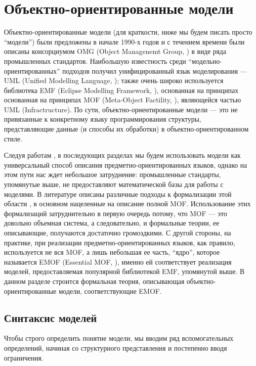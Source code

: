 \chapter{Объектно-ориентированные модели}

Объектно-ориентированные модели (для краткости, ниже мы будем писать просто ``модели'') были предложены в начале 1990-х годов \cite{Booch, Rumbaugh} и с течением времени были описаны консорциумом OMG (Object Managenemt Group, \cite{OMG}) в виде ряда промышленных стандартов. Наибольшую известность среди ``модельно-ориентированных'' подходов получил унифицированный язык моделирования --- UML (Unified Modelling Language, \cite{UML}); также очень широко используется библиотека EMF (Eclipse Modelling Framework, \cite{EMF}), основанная на принципах основанная на принципах MOF (Meta-Object Factility, \cite{MOF}), являющейся частью UML (Infractructure). По сути, объектно-ориентированные модели --- это не привязанные к конкретному языку программирования структуры, представляющие данные (и способы их обработки) в объектно-ориентированном стиле.

Следуя работам \cite{Fowler, xText}, в последующих разделах мы будем использовать модели как универсальный способ описания предметно-ориентированных языков, однако на этом пути нас ждет небольшое затруднение: промышленные стандарты, упомянутые выше, не предоставляют математической базы для работы с моделями. В литературе описаны различные подходы к формализации этой области \cite{TypeMOF, MaudeMOF, FormalizingMOF}, в основном нацеленные на описание полной MOF. Использование этих формализаций затруднительно в первую очередь потому, что MOF --- это довольно объемная система, а следовательно, и формальные теории, ее описывающие, получаются достаточно громоздкими. С другой стороны, на практике, при реализации предметно-ориентированных языков, как правило, используется не вся MOF, а лишь небольшая ее часть, ``ядро'', которое называется EMOF (Essential MOF, \cite{EMOF}), именно ей соответствует реализация моделей, предоставляемая популярной библиотекой EMF, упомянутой выше. В данном разделе строится формальная теория, описывающая объектно-ориентированные модели, соответствующие EMOF.

\section{Синтаксис моделей}

Чтобы строго определить понятие модели, мы вводим ряд вспомогательных определений, начиная со структурного представления и постепенно вводя ограничения.

